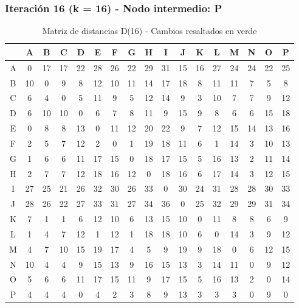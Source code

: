 \documentclass[12pt]{article}
\begin{document}
\subsubsection{Iteración 16 (k = 16) - Nodo intermedio: P}
\begin{table}[h!]
\centering
\begin{tabular}{|c|c|c|c|c|c|c|c|c|c|c|c|c|c|c|c|c|}
\hline
 & A & B & C & D & E & F & G & H & I & J & K & L & M & N & O & P \\\hline
A & 0 & 17 & 17 & 22 & 28 & 26 & 22 & 29 & 31 & 15 & 16 & 27 & 24 & 24 & 22 & 25 \\\hline
B & 10 & 0 & 9 & \cellcolor{lightgreen} 8 & \cellcolor{lightgreen} 12 & \cellcolor{lightgreen} 10 & \cellcolor{lightgreen} 11 & 14 & \cellcolor{lightgreen} 17 & 18 & 8 & \cellcolor{lightgreen} 11 & \cellcolor{lightgreen} 11 & 7 & 5 & 8 \\\hline
C & 6 & 4 & 0 & 5 & 11 & 9 & 5 & 12 & 14 & 9 & 3 & 10 & 7 & 7 & 9 & 12 \\\hline
D & 6 & 10 & 10 & 0 & 6 & 7 & 8 & 11 & 9 & 15 & 9 & 8 & 6 & 6 & 15 & 18 \\\hline
E & 0 & 8 & 8 & 13 & 0 & 11 & 12 & 20 & 22 & 9 & 7 & 12 & 15 & 14 & 13 & 16 \\\hline
F & 2 & 5 & 7 & 12 & 2 & 0 & 1 & 19 & 18 & 11 & 6 & 1 & 14 & 3 & 10 & 13 \\\hline
G & 1 & 6 & 6 & 11 & 17 & 15 & 0 & 18 & 17 & 15 & 5 & 16 & 13 & 2 & 11 & 14 \\\hline
H & 2 & 7 & 7 & 12 & 18 & 16 & 12 & 0 & 18 & 16 & 6 & 17 & 14 & 3 & 12 & 15 \\\hline
I & 27 & 25 & 21 & 26 & 32 & 30 & 26 & 33 & 0 & 30 & 24 & 31 & 28 & 28 & 30 & 33 \\\hline
J & 28 & 26 & 22 & 27 & 33 & 31 & 27 & 34 & 36 & 0 & 25 & 32 & 29 & 29 & 31 & 34 \\\hline
K & 7 & 1 & 1 & 6 & 12 & 10 & 6 & 13 & 15 & 10 & 0 & 11 & 8 & 8 & 6 & 9 \\\hline
L & 1 & 4 & 7 & 12 & 1 & 12 & 1 & 18 & 18 & 10 & 6 & 0 & 14 & 3 & 9 & 12 \\\hline
M & 4 & 7 & 10 & 15 & \cellcolor{lightgreen} 19 & \cellcolor{lightgreen} 17 & 4 & 5 & 9 & 19 & 9 & \cellcolor{lightgreen} 18 & 0 & 6 & 12 & 15 \\\hline
N & 10 & 4 & 4 & 9 & 15 & 13 & 9 & 16 & 15 & 13 & 3 & 14 & 11 & 0 & 9 & 12 \\\hline
O & 5 & 6 & 6 & 11 & 17 & 15 & 11 & 9 & 17 & 15 & 5 & 16 & 13 & 2 & 0 & 14 \\\hline
P & 4 & 4 & 4 & 0 & 4 & 2 & 3 & 8 & 9 & 13 & 3 & 3 & 3 & 0 & 9 & 0 \\\hline
\end{tabular}
\caption{Matriz de distancias D(16) - Cambios resaltados en verde}
\end{table}
\end{document}
